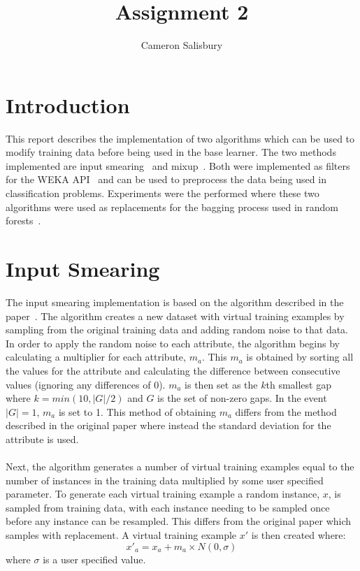 \documentclass{article}
\begin{document}
\title{Assignment 2}
\author{Cameron Salisbury}

\maketitle

\section{Introduction}

This report describes the implementation of two algorithms which can be used to modify training data before being used in the base learner. The two methods implemented are input smearing~\cite{smear} and mixup~\cite{mixup}. Both were implemented as filters for the WEKA API~\cite{weka} and can be used to preprocess the data being used in classification problems. Experiments were the performed where these two algorithms were used as replacements for the bagging process used in random forests~\cite{forest}.

\section{Input Smearing}

The input smearing implementation is based on the algorithm described in the paper~\cite{smear}. The algorithm creates a new dataset with virtual training examples by sampling from the original training data and adding random noise to that data. In order to apply the random noise to each attribute, the algorithm begins by calculating a multiplier for each attribute, $m_a$. This $m_a$ is obtained by sorting all the values for the attribute and calculating the difference between consecutive values (ignoring any differences of 0). $m_a$ is then set as the $k$th smallest gap where $k = min(10, \left|G\right| / 2)$ and $G$ is the set of non-zero gaps. In the event $\left|G\right| = 1$, $m_a$ is set to 1. This method of obtaining $m_a$ differs from the method described in the original paper where instead the standard deviation for the attribute is used.

\paragraph*{}

Next, the algorithm generates a number of virtual training examples equal to the number of instances in the training data multiplied by some user specified parameter. To generate each virtual training example a random instance, $x$, is sampled from training data, with each instance needing to be sampled once before any instance can be resampled. This differs from the original paper which samples with replacement. A virtual training example $x'$ is then created where:
\[
x'_a = x_a + m_a \times N(0,\sigma)
\]
where $\sigma$ is a user specified value.
\end{document}
